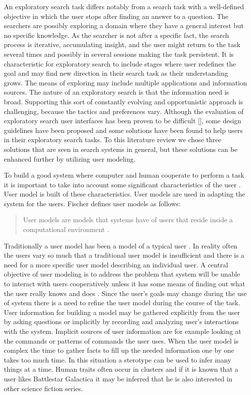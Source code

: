 \documentclass{sigchi}
\begin{document}
An exploratory search task differs notably from a search task with a well-defined objective in which the user stops after finding an answer to a question. The searchers are possibly exploring a domain where they have a general interest but no specific knowledge. As the searcher is not after a specific fact, the search process is iterative, accumulating insight, and the user might return to the task several times and possibly in several sessions making the task persistent.  It is characteristic for exploratory search to include stages where user redefines the goal and may find new direction in their search task as their understanding grows. The means of exploring may include multiple applications and information sources.
The nature of an exploratory search is that the information need is broad. Supporting this sort of constantly evolving and opportunistic approach is challenging, because the tactics and preferences vary. Although the evaluation of exploratory search user interfaces has been proven to be difficult [], some design guidelines have been proposed and some solutions have been found to help users in their exploratory search tasks. To this literature review we chose three solutions that are seen in search systems in general, but these solutions can be enhanced further by utilizing user modeling.

To build a good system where computer and human cooperate to perform a task it is important to take into account some significant characteristics of the user \cite{rich99}. User model is built of these characteristics. User models are used in adapting the system for the users. Fischer defines user models as follows:

\blockquote{User models are models that systems have of users that reside inside a computational environment \cite{fischer01}. }

Traditionally a user model has been a model of a typical user \cite{rich99}. In reality often the users vary so much that a traditional user model is insufficient and there is a need for a more specific user model describing an individual user.  A central objective of user modeling is to address the problem that system will be unable to interact with users cooperatively unless it has some means of finding out what the user really knows and does \cite{fischer01}. Since the user's goals may change during the use of system there is a need to refine the user model during the course of the task. User information for building a model may be gathered explicitly from the user by asking questions or implicitly by recording and analyzing user's interactions with the system. Implicit sources of user information are for example looking at the commands or patterns of commands the user uses. When the user model is complex the time to gather facts to fill up the needed information one by one takes too much time. In this situation a sterotype can be used to infer many things at a time. Human traits often occur in clusters and if it is known that a user likes Battlestar Galactica it may be inferred that he is also interested in other science fiction series. 
\end{document}
